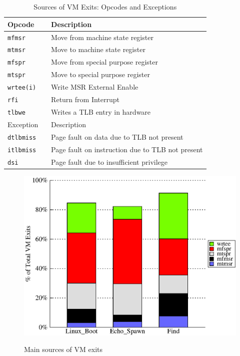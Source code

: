 \documentclass[10pt,twocolumn]{article}
\begin{document}
\begin{table}[!b]
\centering
     \begin{tabular}{|l | p{5cm} |} \hline
       Opcode \verb, , & Description \\ \hline
       {\tt mfmsr} & Move from machine state register \\ \hline
       {\tt mtmsr} & Move to machine state register \\\hline
       {\tt mfspr} & Move from special purpose register \\\hline
       {\tt mtspr} & Move to special purpose register \\\hline
       {\tt wrtee(i)} & Write MSR External Enable  \\\hline
       {\tt rfi} & Return from Interrupt \\\hline
       {\tt tlbwe} & Writes a TLB entry in hardware\\\hline
       \hline
       Exception \verb, , & Description \\ \hline
       {\tt dtlbmiss} & Page fault on data due to TLB not present\\    \hline
       {\tt itlbmiss} & Page fault on instruction due to TLB not present\\    \hline
       {\tt dsi} & Page fault due to insufficient privilege\\\hline

     \end{tabular}
\caption{\label{tab:priv_opcodes} Sources of VM Exits: Opcodes and Exceptions}
\end{table}

\begin{figure}[!htb]
\centering
\includegraphics[scale=0.5]{exit_count.eps}
\label{fig:opcode_exit_fraction}
\caption{Main sources of VM exits}
\end{figure}
\end{document}

